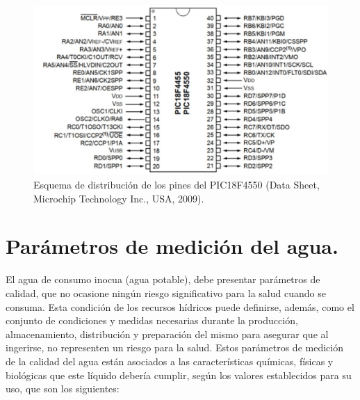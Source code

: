 \documentclass[conference]{IEEEtran}
\begin{document}
	\begin{figure}[htbp]
		\centering
		\includegraphics[width=0.6\columnwidth]{fig9.jpg}
		\caption{Esquema de distribución de los pines del PIC18F4550 (Data Sheet, Microchip Technology Inc., USA, 2009).}
		\label{fig:secuencia-acciones}
	\end{figure}
	
	\section{Parámetros de medición del agua.}
	El agua de consumo inocua (agua potable), debe presentar parámetros de calidad, que no ocasione ningún riesgo significativo para la salud cuando se consuma. Esta condición de los recursos hídricos puede definirse, además, como el conjunto de condiciones y medidas necesarias durante la producción, almacenamiento, distribución y preparación del mismo para asegurar que al ingerirse, no representen un riesgo para la salud. Estos parámetros de medición de la calidad del agua están asociados a las características químicas, físicas y biológicas que este líquido debería cumplir, según los valores establecidos para su uso, que son los siguientes:
	
\end{document}
